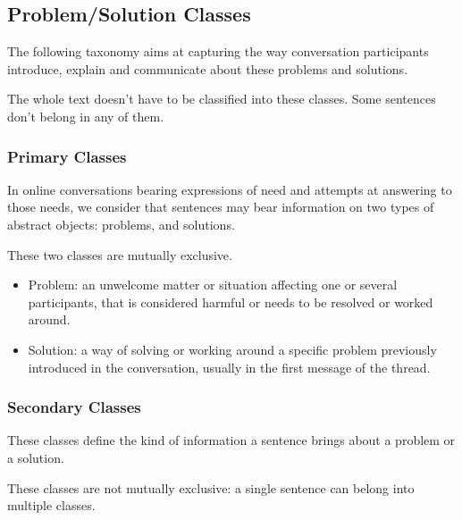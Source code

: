 \documentclass[11pt]{article}
\begin{document}
\subsection{Problem/Solution Classes}

The following taxonomy aims at capturing the way conversation participants introduce, explain and communicate about these problems and solutions.

The whole text doesn't have to be classified into these classes. Some sentences don't belong in any of them. 

\subsubsection{Primary Classes}

In online conversations bearing expressions of need and attempts at answering to those needs, we consider that sentences may bear information on two types of abstract objects: problems, and solutions.

These two classes are mutually exclusive.

\begin{itemize}
	\item Problem: an unwelcome matter or situation affecting one or several participants, that is considered harmful or needs to be resolved or worked around.
	\item Solution: a way of solving or working around a specific problem previously introduced in the conversation, usually in the first message of the thread.
\end{itemize}

\subsubsection{Secondary Classes}

These classes define the kind of information a sentence brings about a problem or a solution.

These classes are not mutually exclusive: a single sentence can belong into multiple classes.
\end{document}
